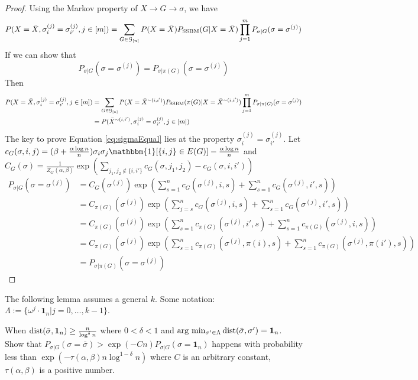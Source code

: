 \documentclass{article}
\begin{document}
\begin{proof}
Using the Markov property of $X \to G \to \sigma$, we have
\begin{align*}
P(X=\bar{X}, \sigma_i^{(j)} = \sigma_{i'}^{(j)}, j\in[m]) & = \sum_{G \in \mathcal{G}_{[n]}} P(X=\bar{X}) P_{\operatorname{SSBM}}(G  | X = \bar{X})\prod_{j=1}^m P_{\sigma | G}(\sigma =\sigma^{(j)})\\
\end{align*}
If we can show that 
\begin{equation}\label{eq:sigmaEqual}
P_{\sigma | G}(\sigma =\sigma^{(j)}) = P_{\sigma | \pi(G)}(\sigma =\sigma^{(j)})
\end{equation}
Then 
\begin{align*}
P(X=\bar{X}, \sigma_i^{(j)} = \sigma_{i'}^{(j)}, j\in[m]) & = \sum_{G \in \mathcal{G}_{[n]}} P(X=\bar{X}^{\sim(i,i')}) P_{\operatorname{SSBM}}(\pi(G)  | X = \bar{X}^{\sim(i,i')})\prod_{j=1}^m P_{\sigma | \pi(G)}(\sigma =\sigma^{(j)})\\
& = P(\bar{X}^{\sim(i,i')}, \sigma_i^{(j)} = \sigma_{i'}^{(j)}, j\in[m])
\end{align*}
The key to prove Equation \eqref{eq:sigmaEqual} lies at the property $\sigma^{(j)}_i = \sigma^{(j)}_{i'}$.
Let $c_G(\sigma, i,j) = (\beta + \frac{\alpha \log n}{n})\sigma_i \sigma_j \mathbbm{1}[\{i,j\}\in E(G)]  - \frac{\alpha \log n}{n}$
and $C_G(\sigma) = \frac{1}{Z_G(\alpha, \beta)}\exp(\sum_{j_1, j_2 \not\in \{i,i'\}} c_G(\sigma, j_1, j_2) - c_G(\sigma, i,i'))$
\begin{align*}
P_{\sigma | G}(\sigma =\sigma^{(j)}) & = C_G(\sigma^{(j)})\exp(\sum_{s=1}^n c_G(\sigma^{(j)}, i, s)
+ \sum_{s=1}^n c_G(\sigma^{(j)}, i',s) ) \\
& = C_{\pi(G)}(\sigma^{(j)})\exp(\sum_{j=s}^n c_G(\sigma^{(j)}, i, s)
+ \sum_{s=1}^n c_G(\sigma^{(j)}, i',s) ) \\
& = C_{\pi(G)}(\sigma^{(j)})\exp(\sum_{s=1}^n c_{\pi(G)}(\sigma^{(j)}, i', s)+ \sum_{s=1}^n c_{\pi(G)}(\sigma^{(j)}, i, s) ) \\
& = C_{\pi(G)}(\sigma^{(j)})\exp(\sum_{s=1}^n c_{\pi(G)}(\sigma^{(j)}, \pi(i), s) + \sum_{s=1}^n c_{\pi(G)}(\sigma^{(j)}, \pi(i'), s) ) \\
& = P_{\sigma | \pi(G)}(\sigma =\sigma^{(j)})
\end{align*}
\end{proof}
The following lemma assumes a general $k$.
Some notation: $\Lambda := \{ \omega^j  \cdot \mathbf{1}_n | j=0, \dots,k-1\}$.
\begin{lemma}
	When $\operatorname{dist}(\bar{\sigma}, \mathbf{1}_n) \geq \frac{n}{\log^{\delta} n}$ where $0<\delta < 1$ and $\arg\,\min_{\sigma'\in \Lambda} \operatorname{dist}(\bar{\sigma}, \sigma') = \mathbf{1}_n$. Show that
	$P_{\sigma | G}(\sigma = \bar{\sigma} ) > \exp(-Cn) P_{\sigma | G}(\sigma = \mathbf{1}_n)$
	happens with probability less than $\exp(-\tau(\alpha,\beta) n \log^{1-\delta} n )$ where $C$ is an arbitrary constant, $\tau(\alpha,\beta)$ is a positive number.
\end{lemma}
\end{document}
